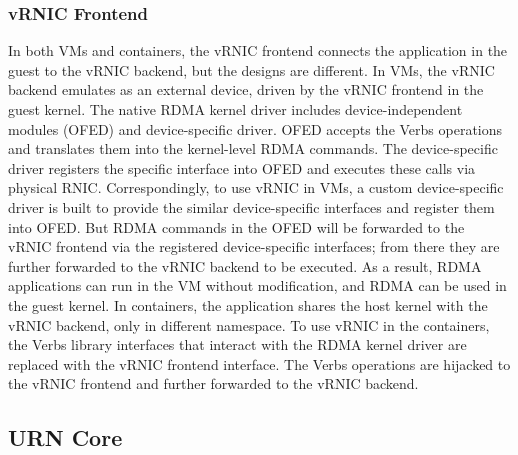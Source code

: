\subsubsection{vRNIC Frontend}

In both VMs and containers, the vRNIC frontend connects the application in the guest to the vRNIC backend, but the designs are different. 
In VMs, the vRNIC backend emulates as an external device, driven by the vRNIC frontend in the guest kernel. The native RDMA kernel driver includes device-independent modules (OFED) and device-specific driver. OFED accepts the Verbs operations and translates them into the kernel-level RDMA commands. The device-specific driver registers the specific interface into OFED and executes these calls via physical RNIC. Correspondingly, to use vRNIC in VMs, a custom device-specific driver is built to provide the similar device-specific interfaces and register them into OFED. But RDMA commands in the OFED will be forwarded to the vRNIC frontend via the registered device-specific interfaces; from there
they are further forwarded to the vRNIC backend to be executed. As a result, RDMA applications can run in the VM without modification, and RDMA can be used in the guest kernel. 
In containers, the application shares the host kernel with the vRNIC backend, only in different namespace. To use vRNIC in the containers, the Verbs library interfaces that interact with the RDMA kernel driver are replaced with the vRNIC frontend interface. The Verbs operations are hijacked to the vRNIC frontend and further forwarded to the vRNIC backend.

\subsection{URN Core}

